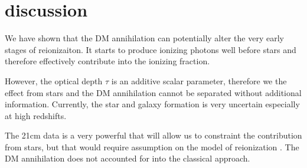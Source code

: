 \section{discussion}

We have shown that the DM annihilation can potentially alter the very early stages of reionizaiton. It starts to produce ionizing photons well before stars and therefore effectively contribute into the ionizing fraction. 

However, the optical depth $\tau$ is an additive scalar parameter, therefore we the effect from stars and the DM annihilation cannot be separated without additional information. Currently, the star and galaxy formation is very uncertain especially at high redshifts.

The 21cm data is a very powerful that will allow us to constraint the contribution from stars, but that would require assumption on the model of reionization . The DM annihilation does not accounted for into the classical approach.